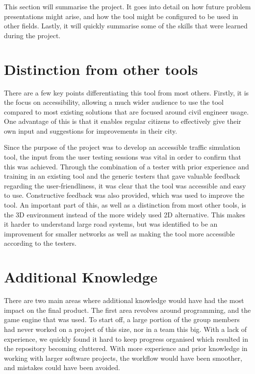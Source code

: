 This section will summarise the project. It goes into detail on how future problem presentations might arise, and how the tool might be configured to be used in other fields. Lastly, it will quickly summarise some of the skills that were learned during the project.

    \section{Distinction from other tools}
        There are a few key points differentiating this tool from most others. Firstly, it is the focus on accessibility, allowing a much wider audience to use the tool compared to most existing solutions that are focused around civil engineer usage. One advantage of this is that it enables regular citizens to effectively give their own input and suggestions for improvements in their city.

        Since the purpose of the project was to develop an accessible traffic simulation tool, the input from the user testing sessions was vital in order to confirm that this was achieved. Through the combination of a tester with prior experience and training in an existing tool and the generic testers that gave valuable feedback regarding the user-friendliness, it was clear that the tool was accessible and easy to use. Constructive feedback was also provided, which was used to improve the tool. An important part of this, as well as a distinction from most other tools, is the 3D environment instead of the more widely used 2D alternative. This makes it harder to understand large road systems, but was identified to be an improvement for smaller networks as well as making the tool more accessible according to the testers.

    \section{Additional Knowledge}
        There are two main areas where additional knowledge would have had the most impact on the final product. The first area revolves around programming, and the game engine that was used. To start off, a large portion of the group members had never worked on a project of this size, nor in a team this big. With a lack of experience, we quickly found it hard to keep progress organised which resulted in the repository becoming cluttered. With more experience and prior knowledge in working with larger software projects, the workflow would have been smoother, and mistakes could have been avoided.


